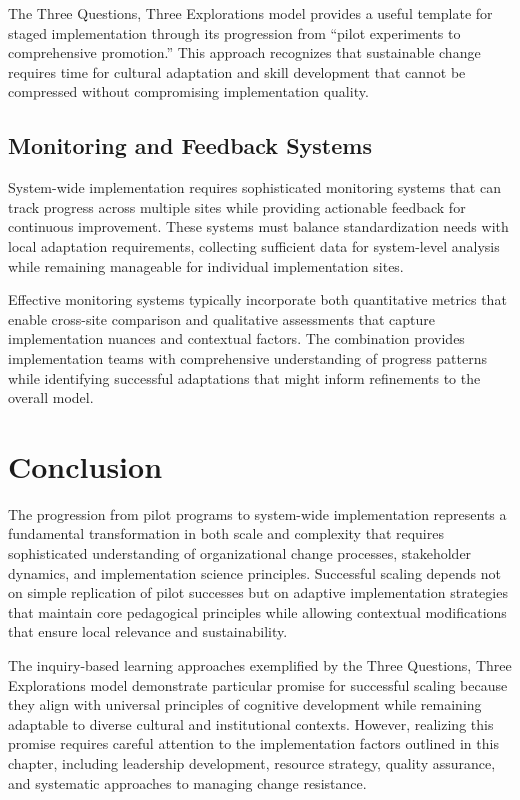 \documentclass[
  Letterpaper,
]{scrbook}
\begin{document}
The Three Questions, Three Explorations model provides a useful template
for staged implementation through its progression from ``pilot
experiments to comprehensive promotion.'' This approach recognizes that
sustainable change requires time for cultural adaptation and skill
development that cannot be compressed without compromising
implementation quality.

\subsection{Monitoring and Feedback
Systems}\label{monitoring-and-feedback-systems}

System-wide implementation requires sophisticated monitoring systems
that can track progress across multiple sites while providing actionable
feedback for continuous improvement. These systems must balance
standardization needs with local adaptation requirements, collecting
sufficient data for system-level analysis while remaining manageable for
individual implementation sites.

Effective monitoring systems typically incorporate both quantitative
metrics that enable cross-site comparison and qualitative assessments
that capture implementation nuances and contextual factors. The
combination provides implementation teams with comprehensive
understanding of progress patterns while identifying successful
adaptations that might inform refinements to the overall model.

\section{Conclusion}\label{conclusion-3}

The progression from pilot programs to system-wide implementation
represents a fundamental transformation in both scale and complexity
that requires sophisticated understanding of organizational change
processes, stakeholder dynamics, and implementation science principles.
Successful scaling depends not on simple replication of pilot successes
but on adaptive implementation strategies that maintain core pedagogical
principles while allowing contextual modifications that ensure local
relevance and sustainability.

The inquiry-based learning approaches exemplified by the Three
Questions, Three Explorations model demonstrate particular promise for
successful scaling because they align with universal principles of
cognitive development while remaining adaptable to diverse cultural and
institutional contexts. However, realizing this promise requires careful
attention to the implementation factors outlined in this chapter,
including leadership development, resource strategy, quality assurance,
and systematic approaches to managing change resistance.
\end{document}
